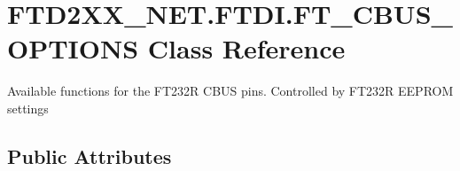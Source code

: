 \hypertarget{class_f_t_d2_x_x___n_e_t_1_1_f_t_d_i_1_1_f_t___c_b_u_s___o_p_t_i_o_n_s}{}\section{F\+T\+D2\+X\+X\+\_\+\+N\+E\+T.\+F\+T\+D\+I.\+F\+T\+\_\+\+C\+B\+U\+S\+\_\+\+O\+P\+T\+I\+O\+NS Class Reference}
\label{class_f_t_d2_x_x___n_e_t_1_1_f_t_d_i_1_1_f_t___c_b_u_s___o_p_t_i_o_n_s}


Available functions for the F\+T232R C\+B\+US pins. Controlled by F\+T232R E\+E\+P\+R\+OM settings  


\subsection*{Public Attributes}
